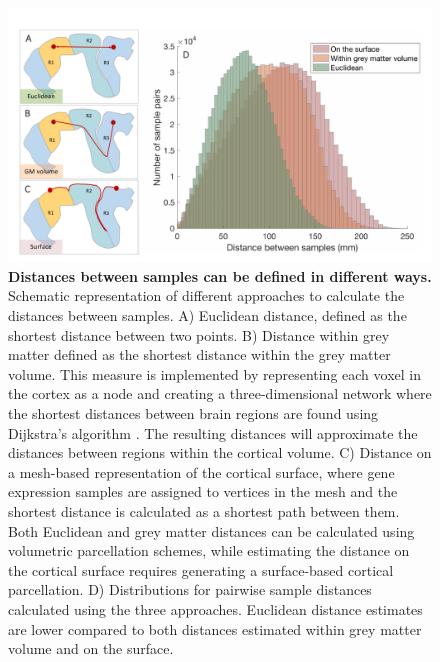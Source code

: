 \documentclass[10pt,A4]{article}
\begin{document}
\begin{figure}[h!]
  \centering
    \includegraphics[width=1\textwidth]{Ch4Fig7.pdf}
\caption{\textbf{Distances between samples can be defined in different ways.}
Schematic representation of different approaches to calculate the distances between samples.
A) Euclidean distance, defined as the shortest distance between two points.
B) Distance within grey matter defined as the shortest distance within the grey matter volume. This measure is implemented by representing each voxel in the cortex as a node and creating a three-dimensional network where the shortest distances between brain regions are found using Dijkstra's algorithm \citep{Dijkstra1959}. The resulting distances will approximate the distances between regions within the cortical volume.
C) Distance on a mesh-based representation of the cortical surface, where gene expression samples are assigned to vertices in the mesh and the shortest distance is calculated as a shortest path between them. Both Euclidean and grey matter distances can be calculated using volumetric parcellation schemes, while estimating the distance on the cortical surface requires generating a surface-based cortical parcellation.
D) Distributions for pairwise sample distances calculated using the three approaches. Euclidean distance estimates are lower compared to both distances estimated within grey matter volume and on the surface. }
\label{fig:Ch4Fig7}
\end{figure}
\end{document}
